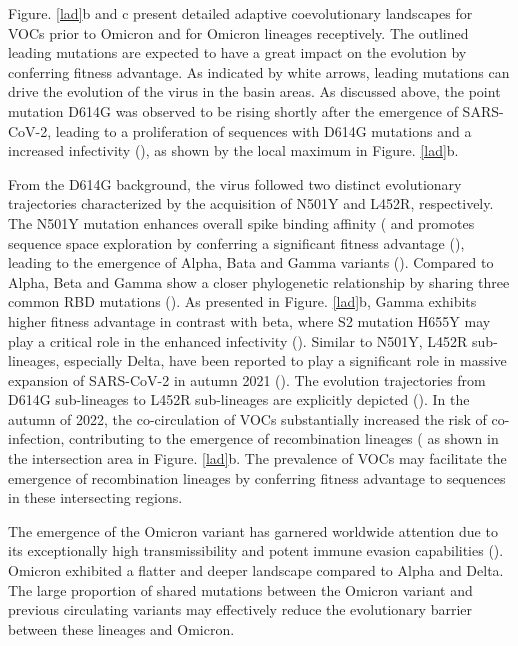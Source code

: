 \documentclass{sysbio}%
\begin{document}
Figure. \ref{lad}b and c present detailed adaptive coevolutionary landscapes for VOCs prior to Omicron and for Omicron lineages receptively. The outlined leading mutations are expected to have a great impact on the evolution by conferring fitness advantage. As indicated by white arrows, leading mutations can drive the evolution of the virus in the basin areas. As discussed above, the point mutation D614G was observed to be rising shortly after the emergence of SARS-CoV-2, leading to a proliferation of sequences with D614G mutations and a increased infectivity (\cite{6141,614,6142}), as shown by the local maximum in Figure. \ref{lad}b. 

From the D614G background, the virus followed two distinct evolutionary trajectories characterized by the acquisition of N501Y and L452R, respectively. The N501Y mutation enhances overall spike binding affinity (\cite{N501Y_binding,N501Y_alpha_bete} and promotes sequence space exploration by conferring a significant fitness advantage (\cite{N501Y_enhance_trans}), leading to the emergence of Alpha, Bata and Gamma variants (\cite{N501Y_lineage}). Compared to Alpha, Beta and Gamma show a closer phylogenetic relationship by sharing three common RBD mutations (\cite{phylogenetic_sar}). As presented in Figure. \ref{lad}b, Gamma exhibits higher fitness advantage in contrast with beta, where S2 mutation H655Y may play a critical role in the enhanced infectivity (\cite{H655Y}). Similar to N501Y, L452R sub-lineages, especially Delta, have been reported to play a significant role in massive expansion of SARS-CoV-2 in autumn 2021 (\cite{L452R_expansion}). The evolution trajectories from D614G sub-lineages to L452R sub-lineages are explicitly depicted (\cite{L452R_expansion,phylogenetic_sar}). In the autumn of 2022, the co-circulation of VOCs substantially increased the risk of co-infection, contributing to the emergence of recombination lineages (\cite{coinfect_recom} as shown in the intersection area in Figure. \ref{lad}b. The prevalence of VOCs may facilitate the emergence of recombination lineages by conferring fitness advantage to sequences in these intersecting regions. 

The emergence of the Omicron variant has garnered worldwide attention due to its exceptionally high transmissibility and potent immune evasion capabilities (\cite{omi_alert,omi_anti_escape}). Omicron exhibited a flatter and deeper landscape compared to Alpha and Delta. The large proportion of shared mutations between the Omicron variant and previous circulating variants may effectively reduce the evolutionary barrier between these lineages and Omicron.
\end{document}
